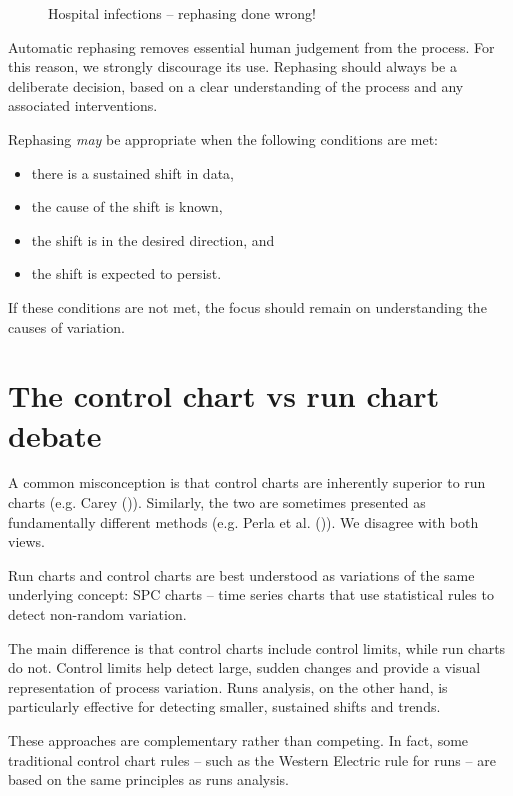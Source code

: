 \documentclass[
]{book}
\makeatletter
\newcommand*\pandocbounded[1]{%
  \sbox\pandoc@box{#1}%
  \Gscale@div\@tempa{\textheight}{\dimexpr\ht\pandoc@box+\dp\pandoc@box\relax}%
  \Gscale@div\@tempb{\linewidth}{\wd\pandoc@box}%
  \ifdim\@tempb\p@<\@tempa\p@\let\@tempa\@tempb\fi%
  \ifdim\@tempa\p@<\p@\scalebox{\@tempa}{\usebox\pandoc@box}%
  \else\usebox{\pandoc@box}%
  \fi%
}
\providecommand{\tightlist}{%
  \setlength{\itemsep}{0pt}\setlength{\parskip}{0pt}}
\makeatother
\begin{document}
\begin{figure}
\centering
\pandocbounded{}
\caption{Hospital infections -- rephasing done wrong!}
\end{figure}

Automatic rephasing removes essential human judgement from the process.
For this reason, we strongly discourage its use. Rephasing should always
be a deliberate decision, based on a clear understanding of the process
and any associated interventions.

Rephasing \emph{may} be appropriate when the following conditions are
met:

\begin{itemize}
\tightlist
\item
  there is a sustained shift in data,
\item
  the cause of the shift is known,
\item
  the shift is in the desired direction, and
\item
  the shift is expected to persist.
\end{itemize}

If these conditions are not met, the focus should remain on
understanding the causes of variation.

\section{The control chart vs run chart
debate}\label{the-control-chart-vs-run-chart-debate}

A common misconception is that control charts are inherently superior to
run charts (e.g. Carey ()). Similarly,
the two are sometimes presented as fundamentally different methods (e.g.
Perla et al. ()). We disagree with both
views.

Run charts and control charts are best understood as variations of the
same underlying concept: SPC charts -- time series charts that use
statistical rules to detect non-random variation.

The main difference is that control charts include control limits, while
run charts do not. Control limits help detect large, sudden changes and
provide a visual representation of process variation. Runs analysis, on
the other hand, is particularly effective for detecting smaller,
sustained shifts and trends.

These approaches are complementary rather than competing. In fact, some
traditional control chart rules -- such as the Western Electric rule for
runs -- are based on the same principles as runs analysis.
\end{document}
